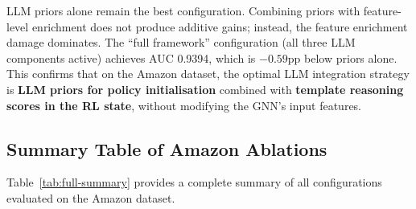 \noindent
LLM priors alone remain the best configuration. Combining priors with feature-level enrichment does not produce additive gains; instead, the feature enrichment damage dominates. The ``full framework'' configuration (all three LLM components active) achieves AUC 0.9394, which is $-0.59$pp below priors alone. This confirms that on the Amazon dataset, the optimal LLM integration strategy is \textbf{LLM priors for policy initialisation} combined with \textbf{template reasoning scores in the RL state}, without modifying the GNN's input features.

\subsection{Summary Table of Amazon Ablations}
\label{sec:amazon-summary-table}

Table~\ref{tab:full-summary} provides a complete summary of all configurations evaluated on the Amazon dataset.

